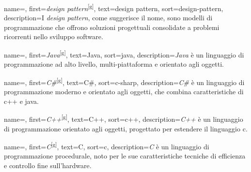  {
    name=,
    first={\textit{design pattern}\textsuperscript{[g]}},
    text=design pattern,
    sort=design-pattern,
    description={I \textit{design pattern}, come suggerisce il nome, sono modelli di programmazione che offrono soluzioni progettuali consolidate a problemi ricorrenti nello sviluppo software.}
}

 {
    name=,
    first={\textit{Java}\textsuperscript{[g]}},
    text=Java,
    sort=java,
    description={\textit{Java} è un linguaggio di programmazione ad alto livello, multi-piattaforma e orientato agli oggetti.}
}

 {
    name=,
    first={\textit{C\#}\textsuperscript{[g]}},
    text=C\#,
    sort=c-sharp,
    description={\textit{C\#} è un linguaggio di programmazione moderno e orientato agli oggetti, che combina caratteristiche di \gls{c++} e \gls{java}.}
}

 {
    name=,
    first={\textit{C++}\textsuperscript{[g]}},
    text=C++,
    sort=c++,
    description={\textit{C++} è un linguaggio di programmazione orientato agli oggetti, progettato per estendere il linguaggio \gls{c}.}
}

 {
    name=,
    first={\textit{C}\textsuperscript{[g]}},
    text=C,
    sort=c,
    description={\textit{C} è un linguaggio di programmazione procedurale, noto per le sue caratteristiche tecniche di efficienza e controllo fine sull’hardware.}
}
